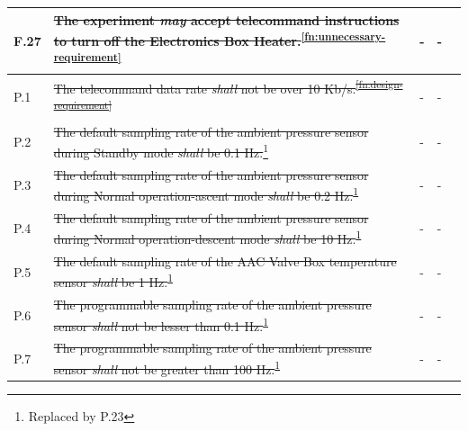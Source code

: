 \documentclass[a4paper,12pt,twoside, final]{article}
\providecommand{\DIFaddtex}[1]{{\protect\color{blue}\uwave{#1}}} %
\providecommand{\DIFdeltex}[1]{{\protect\color{red}\sout{#1}}}                      %
\providecommand{\DIFaddbegin}{} %
\providecommand{\DIFaddend}{} %
\providecommand{\DIFdelbegin}{} %
\providecommand{\DIFdelend}{} %
\providecommand{\DIFadd}[1]{\texorpdfstring{\DIFaddtex{#1}}{#1}} %
\providecommand{\DIFdel}[1]{\texorpdfstring{\DIFdeltex{#1}}{}} %
\newcommand{\DIFscaledelfig}{0.5}
\newlength{\DIFdelgraphicswidth} %
\newlength{\DIFdelgraphicsheight} %
\newcommand{\DIFaddincludegraphics}[2][]{{\color{blue}\fbox{\DIFOincludegraphics[#1]{#2}}}} %
\newcommand{\DIFdelincludegraphics}[2][]{%
\sbox{\DIFdelgraphicsbox}{\DIFOincludegraphics[#1]{#2}}%
\settoboxwidth{\DIFdelgraphicswidth}{\DIFdelgraphicsbox} %
\settoboxtotalheight{\DIFdelgraphicsheight}{\DIFdelgraphicsbox} %
\scalebox{\DIFscaledelfig}{%
\parbox[b]{\DIFdelgraphicswidth}{\usebox{\DIFdelgraphicsbox}\\[-\baselineskip] \rule{\DIFdelgraphicswidth}{0em}}\llap{\resizebox{\DIFdelgraphicswidth}{\DIFdelgraphicsheight}{%
\setlength{\unitlength}{\DIFdelgraphicswidth}%
\begin{picture}(1,1)%
\thicklines\linethickness{2pt} %
{\color[rgb]{1,0,0}\put(0,0){\framebox(1,1){}}}%
{\color[rgb]{1,0,0}\put(0,0){\line( 1,1){1}}}%
{\color[rgb]{1,0,0}\put(0,1){\line(1,-1){1}}}%
\end{picture}%
}\hspace*{3pt}}} %
} %
\DeclareRobustCommand{\DIFaddbegin}{\DIFOaddbegin \let\includegraphics\DIFaddincludegraphics} %
\DeclareRobustCommand{\DIFaddend}{\DIFOaddend \let\includegraphics\DIFOincludegraphics} %
\DeclareRobustCommand{\DIFdelbegin}{\DIFOdelbegin \let\includegraphics\DIFdelincludegraphics} %
\DeclareRobustCommand{\DIFdelend}{\DIFOaddend \let\includegraphics\DIFOincludegraphics} %
\begin{document}
\begin{longtable}[]{|m{}| m{} |m{} |m{}|m{}|}
F.27 & \st{The experiment \textit{may} accept telecommand instructions to turn off the Electronics Box Heater.}\textsuperscript{\ref{fn:unnecessary-requirement}}                                                                                    &      -        & -            &        \\ \hline
P.1  & \DIFdelbegin %
\DIFdelend \DIFaddbegin \st{The telecommand data rate \textit{shall} not be over 10 Kb/s.}\DIFaddend \textsuperscript{\DIFdelbegin \DIFdel{\ref{fn:design-requirement}}\DIFdelend \DIFaddbegin \DIFadd{\ref{designRequirement}}\DIFaddend }                                                                                                                           &        -      & -          &        \\ \hline
P.2  & \st{The default sampling rate of the ambient pressure sensor during Standby mode \textit{shall} be 0.1 Hz.}\footnote{Replaced by P.23\label{replaceSoftVeri}}                                                                       &      -  & -  &        \\ \hline
P.3  & \st{The default sampling rate of the ambient pressure sensor during Normal operation-ascent mode \textit{shall} be 0.2 Hz.}\textsuperscript{\ref{replaceSoftVeri}}                                                           &    -        & -        &        \\ \hline
P.4  & \st{The default sampling rate of the ambient pressure sensor during Normal operation-descent mode \textit{shall} be 10 Hz.}\textsuperscript{\ref{replaceSoftVeri}}                                                           &   -     & -    &        \\ \hline
P.5  & \st{The default sampling rate of the AAC Valve Box temperature sensor \textit{shall} be 1 Hz.}\textsuperscript{\ref{replaceSoftVeri}}                                                                                        &     -        &  -            &        \\ \hline
P.6  &\st{ The programmable sampling rate of the ambient pressure sensor \textit{shall} not be lesser than 0.1 Hz.}\textsuperscript{\ref{replaceSoftVeri}}                                                                          &      -    & -            &        \\ \hline
P.7  & \st{The programmable sampling rate of the ambient pressure sensor \textit{shall} not be greater than 100 Hz.}\textsuperscript{\ref{replaceSoftVeri}}                                                                         &       -     & -           &        \\ \hline

\end{longtable}
\end{document}
